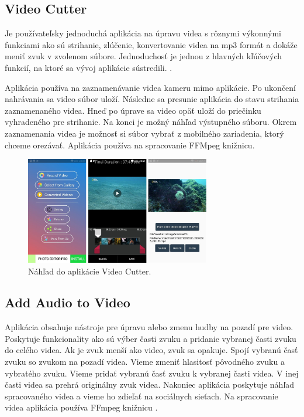 \documentclass[12pt, oneside]{book}
\begin{document}
\subsection{Video Cutter}

\hspace{15pt} Je používateľsky jednoduchá aplikácia na úpravu videa s rôznymi výkonnými funkciami ako sú strihanie, zlúčenie, konvertovanie videa na mp3 formát a dokáže meniť zvuk v zvolenom súbore. 
Jednoduchosť je jednou z hlavných kľúčových funkcií, na ktoré sa vývoj aplikácie sústredili. \citep{aplikacia2}.

Aplikácia používa na zaznamenávanie videa kameru mimo aplikácie. Po ukončení nahrávania sa video súbor uloží. Následne sa presunie aplikácia do stavu strihania zaznamenaného videa. Hneď po úprave sa video opäť uloží do priečinku vyhradeného pre strihanie. Na konci je možný náhľad výstupného súboru. Okrem zaznamenania videa je možnosť si súbor vybrať z mobilného zariadenia, ktorý chceme orezávať. Aplikácia používa na spracovanie FFMpeg knižnicu.

\begin{figure}[h]
    \centering
    \includegraphics[width=0.72\textwidth]{images/aplikacia2.jpg}
    \caption{Náhľad do aplikácie Video Cutter.}
    \label{fig:obr03}
\end{figure}

\subsection{Add Audio to Video}

\hspace{15pt} Aplikácia obsahuje nástroje pre úpravu alebo zmenu hudby na pozadí pre video. Poskytuje funkcionality ako sú výber časti zvuku a pridanie vybranej časti zvuku do celého videa. Ak je zvuk menší ako video, zvuk sa opakuje. Spojí vybranú časť zvuku so zvukom na pozadí videa. Vieme zmeniť hlasitosť pôvodného zvuku a vybratého zvuku. Vieme pridať vybranú časť zvuku k vybranej časti videa. V inej časti videa sa prehrá originálny zvuk videa. Nakoniec aplikácia poskytuje náhľad spracovaného videa a vieme ho zdieľať na sociálnych sieťach. Na spracovanie videa aplikácia používa FFmpeg knižnicu \citep{aplikacia3}.
\end{document}
